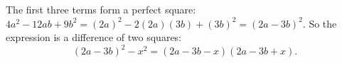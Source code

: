 The first three terms form a perfect square: $4a^2-12ab+9b^2=(2a)^2-2(2a)(3b)+(3b)^2=(2a-3b)^2$. So the expression is a difference of two squares:
\[
(2a-3b)^2-x^2=\boxed{(2a-3b-x)(2a-3b+x)} .
\]
